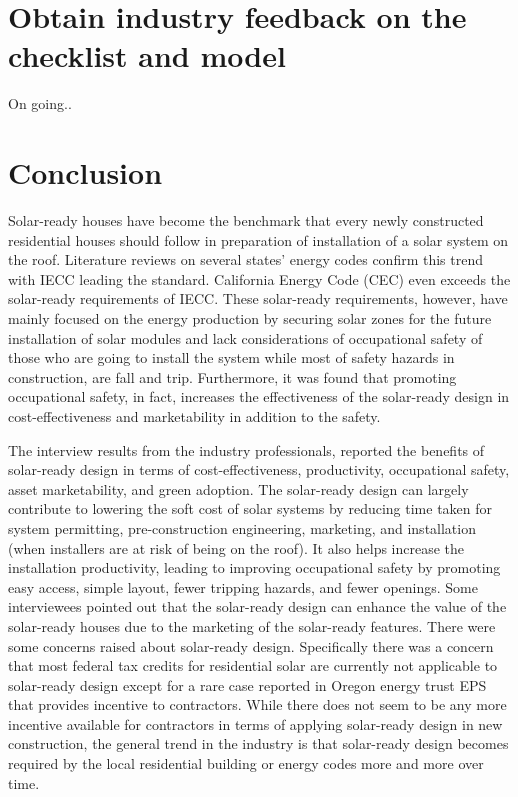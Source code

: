 \documentclass[]{article}
\begin{document}
\hypertarget{obtain-industry-feedback-on-the-checklist-and-model}{%
\section{Obtain industry feedback on the checklist and
model}\label{obtain-industry-feedback-on-the-checklist-and-model}}

On going..

\hypertarget{conclusion}{%
\section{Conclusion}\label{conclusion}}

Solar-ready houses have become the benchmark that every newly
constructed residential houses should follow in preparation of
installation of a solar system on the roof. Literature reviews on
several states' energy codes confirm this trend with IECC leading the
standard. California Energy Code (CEC) even exceeds the solar-ready
requirements of IECC. These solar-ready requirements, however, have
mainly focused on the energy production by securing solar zones for the
future installation of solar modules and lack considerations of
occupational safety of those who are going to install the system while
most of safety hazards in construction, are fall and trip. Furthermore,
it was found that promoting occupational safety, in fact, increases the
effectiveness of the solar-ready design in cost-effectiveness and
marketability in addition to the safety.

The interview results from the industry professionals, reported the
benefits of solar-ready design in terms of cost-effectiveness,
productivity, occupational safety, asset marketability, and green
adoption. The solar-ready design can largely contribute to lowering the
soft cost of solar systems by reducing time taken for system permitting,
pre-construction engineering, marketing, and installation (when
installers are at risk of being on the roof). It also helps increase the
installation productivity, leading to improving occupational safety by
promoting easy access, simple layout, fewer tripping hazards, and fewer
openings. Some interviewees pointed out that the solar-ready design can
enhance the value of the solar-ready houses due to the marketing of the
solar-ready features. There were some concerns raised about solar-ready
design. Specifically there was a concern that most federal tax credits
for residential solar are currently not applicable to solar-ready design
except for a rare case reported in Oregon energy trust EPS that provides
incentive to contractors. While there does not seem to be any more
incentive available for contractors in terms of applying solar-ready
design in new construction, the general trend in the industry is that
solar-ready design becomes required by the local residential building or
energy codes more and more over time.
\end{document}
